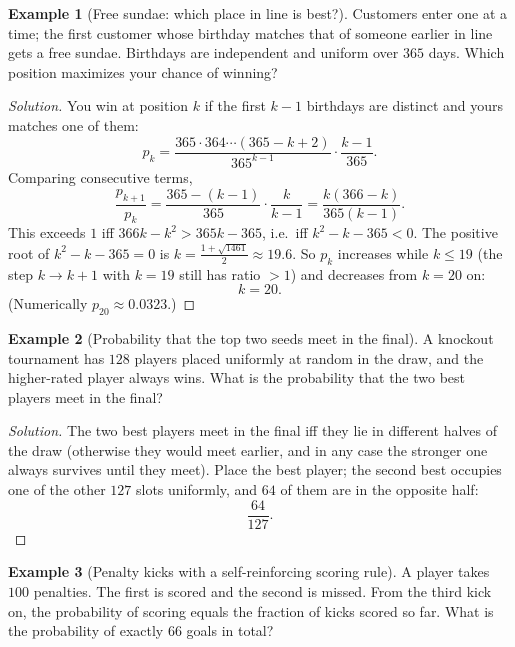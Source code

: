 \documentclass[11pt]{article}
\theoremstyle{definition}
\newtheorem{example}{Example}[section]
\begin{document}
\begin{example}[Free sundae: which place in line is best?]
Customers enter one at a time; the first customer whose birthday matches that of someone earlier in line gets a free sundae. Birthdays are independent and uniform over $365$ days. Which position maximizes your chance of winning?
\end{example}

\begin{proof}[Solution]
You win at position $k$ if the first $k-1$ birthdays are distinct and yours matches one of them:
\[
p_k=\frac{365\cdot364\cdots(365-k+2)}{365^{k-1}}\cdot\frac{k-1}{365}.
\]
Comparing consecutive terms,
\[
\frac{p_{k+1}}{p_k}=\frac{365-(k-1)}{365}\cdot\frac{k}{k-1}=\frac{k(366-k)}{365(k-1)}.
\]
This exceeds $1$ iff $366k-k^2>365k-365$, i.e.\ iff $k^2-k-365<0$. The positive root of $k^2-k-365=0$ is $k=\tfrac{1+\sqrt{1461}}2\approx19.6$. So $p_k$ increases while $k\le19$ (the step $k\to k+1$ with $k=19$ still has ratio $>1$) and decreases from $k=20$ on:
\[
\boxed{k=20}.
\]
(Numerically $p_{20}\approx0.0323$.)
\end{proof}

\begin{example}[Probability that the top two seeds meet in the final]
A knockout tournament has $128$ players placed uniformly at random in the draw, and the higher-rated player always wins. What is the probability that the two best players meet in the final?
\end{example}

\begin{proof}[Solution]
The two best players meet in the final iff they lie in different halves of the draw (otherwise they would meet earlier, and in any case the stronger one always survives until they meet). Place the best player; the second best occupies one of the other $127$ slots uniformly, and $64$ of them are in the opposite half:
\[
\boxed{\frac{64}{127}}.
\]
\end{proof}

\begin{example}[Penalty kicks with a self-reinforcing scoring rule]
A player takes $100$ penalties. The first is scored and the second is missed. From the third kick on, the probability of scoring equals the fraction of kicks scored so far. What is the probability of exactly $66$ goals in total?
\end{example}
\end{document}

